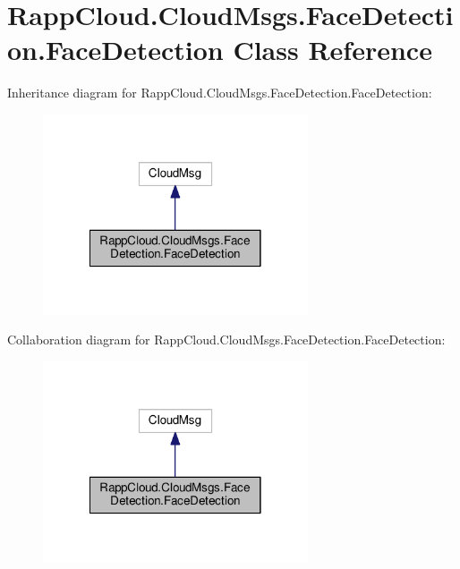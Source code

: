 \hypertarget{classRappCloud_1_1CloudMsgs_1_1FaceDetection_1_1FaceDetection}{\section{Rapp\-Cloud.\-Cloud\-Msgs.\-Face\-Detection.\-Face\-Detection Class Reference}
\label{classRappCloud_1_1CloudMsgs_1_1FaceDetection_1_1FaceDetection}
}


Inheritance diagram for Rapp\-Cloud.\-Cloud\-Msgs.\-Face\-Detection.\-Face\-Detection\-:
\nopagebreak
\begin{figure}[H]
\begin{center}
\leavevmode
\includegraphics[width=222pt]{classRappCloud_1_1CloudMsgs_1_1FaceDetection_1_1FaceDetection__inherit__graph}
\end{center}
\end{figure}


Collaboration diagram for Rapp\-Cloud.\-Cloud\-Msgs.\-Face\-Detection.\-Face\-Detection\-:
\nopagebreak
\begin{figure}[H]
\begin{center}
\leavevmode
\includegraphics[width=222pt]{classRappCloud_1_1CloudMsgs_1_1FaceDetection_1_1FaceDetection__coll__graph}
\end{center}
\end{figure}
